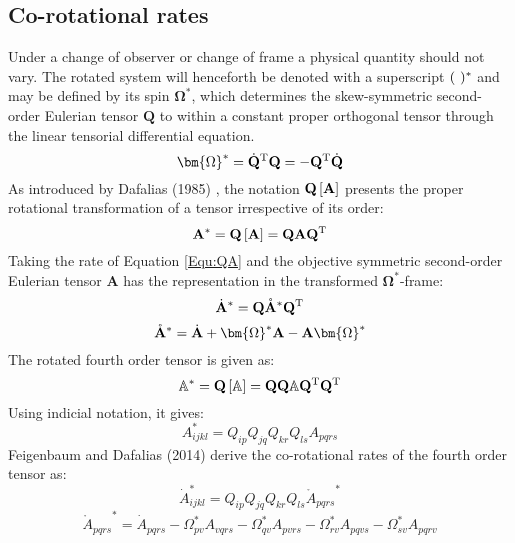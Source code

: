 \subsection{Co-rotational rates}
\noindent
Under a change of observer or change of frame a physical quantity should not vary.
The rotated system will henceforth be denoted with a superscript $(\rm{\ })^*$ and may be defined by its spin $\bm{\Omega}^*$, which determines the skew-symmetric second-order Eulerian tensor $\mathbf{Q}$ to within a constant proper orthogonal tensor through the linear tensorial differential equation.
\begin{equation}
{{\bm{\Omega }}^*} = {{{\dot {\bf{Q}}}}^{\rm{T}}}{\bf{Q}} =  - {{\bf{Q}}^{\rm{T}}}{\dot {\bf{Q}}}
\end{equation}
As introduced by Dafalias (1985) \cite{dafalias1985plastic}, the notation ${\bf{Q}}\left[ {\bf{A}} \right]$ presents the proper rotational transformation of a tensor irrespective of its order:
\begin{equation}
\label{Equ:QA}
{{\bf{A}}^*} = {\bf{Q}}\left[ {\bf{A}} \right] = {\bf{QA}}{{\bf{Q}}^{\rm{T}}}
\end{equation}
Taking the rate of Equation \ref{Equ:QA} and the objective symmetric second-order Eulerian tensor ${\mathbf{A}}$ has the representation in the transformed ${{\mathbf{\Omega }}^*}$-frame:
\begin{equation}
{{{\dot {\bf{A}}}}^*} = {\bf{Q}}\mathring {\bf{A}}^* {{\bf{Q}}^{\rm{T}}}
\end{equation}
\begin{equation}
\label{Equ:CorotationalRates2ndOrder}
\mathring {\bf{A}}^*   = {\dot {\bf{A}}} + {{\bm{\Omega}}^*}{\bf{A}} - {\bf{A}}{{\bm{\Omega}}^*}
\end{equation}
The rotated fourth order tensor is given as:
\begin{equation}
{\mathbb{A}^*} = {\bf{Q}}\left[ \mathbb{A} \right] = {\bf{QQ}}\mathbb{A}{{\bf{Q}}^{\rm{T}}}{{\bf{Q}}^{\rm{T}}}
\end{equation}
Using indicial notation, it gives:
\begin{equation}
A_{ijkl}^* = {Q_{ip}}{Q_{jq}}{Q_{kr}}{Q_{ls}}{A_{pqrs}}
\end{equation}
Feigenbaum and Dafalias (2014) \cite{feigenbaum2014directional} derive the co-rotational rates of the fourth order tensor as:
\begin{equation}
\dot A_{ijkl}^* = {Q_{ip}}{Q_{jq}}{Q_{kr}}{Q_{ls}}{\mathring A _{pqrs}}^*
\end{equation}
\begin{equation}
{\mathring A _{pqrs}}^* = {{\dot A}_{pqrs}} - \Omega _{pv}^*{A_{vqrs}} - \Omega _{qv}^*{A_{pvrs}} - \Omega _{rv}^*{A_{pqvs}} - \Omega _{sv}^*{A_{pqrv}}
\end{equation}


